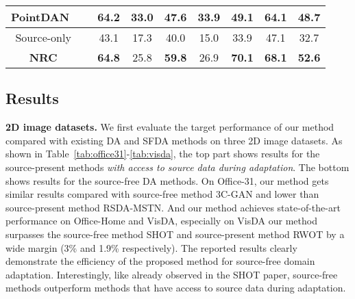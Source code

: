 \documentclass{article}
\newcommand{\cmark}{\ding{51}}\newcommand{\xmark}{\ding{55}}
\begin{document}
\begin{table}[btp]
\begin{minipage}[tbp]{0.99\textwidth}
\begin{center}
{{\begin{threeparttable}
\begin{tabular}{l|c|ccc cc cc}
\multicolumn{1}{c}{PointDAN~\cite{qin2019pointdan}}&\multicolumn{1}{|c|}{\xmark} &\multicolumn{1}{c}{{64.2}} &\multicolumn{1}{c}{\textbf{33.0}} &\multicolumn{1}{c}{{47.6}}  &\multicolumn{1}{c}{\textbf{33.9}} &\multicolumn{1}{c}{{49.1}} &\multicolumn{1}{c}{{64.1}}  &\multicolumn{1}{c}{{48.7}}\\

\toprule
\multicolumn{1}{c}{Source-only}&\multicolumn{1}{|c|}{} &\multicolumn{1}{c}{43.1} &\multicolumn{1}{c}{17.3} &\multicolumn{1}{c}{40.0}  &\multicolumn{1}{c}{15.0} &\multicolumn{1}{c}{33.9} &\multicolumn{1}{c}{47.1}  &\multicolumn{1}{c}{32.7}\\



\multicolumn{1}{c}{\textbf{NRC}}&\multicolumn{1}{|c|}{\cmark}&\multicolumn{1}{c}{\textbf{64.8}} &\multicolumn{1}{c}{{25.8}} &\multicolumn{1}{c}{\textbf{59.8}}  &\multicolumn{1}{c}{{26.9}} &\multicolumn{1}{c}{\textbf{70.1}} &\multicolumn{1}{c}{\textbf{68.1}}  &\multicolumn{1}{c}{\textbf{52.6}}\\

\hline
\end{tabular}
\renewcommand{\labelitemi}{}
\end{threeparttable}
}}
\end{center}
\vspace{-4mm}
\end{minipage}
\end{table}



\subsection{Results}
\noindent \textbf{2D image datasets.} We first evaluate the target performance of our method compared with existing DA and SFDA methods on three 2D image datasets. As shown in Table~\ref{tab:office31}-\ref{tab:visda}, the top part shows results for the source-present methods \textit{with access to source data during adaptation}. The bottom shows results for the source-free DA methods. 
On Office-31, our method gets similar results compared with source-free method 3C-GAN and lower than source-present method RSDA-MSTN. And our method achieves state-of-the-art performance on Office-Home and VisDA, especially on VisDA our method surpasses the source-free method SHOT and source-present method RWOT by a wide margin (3\% and 1.9\% respectively). The reported results clearly demonstrate the efficiency of the proposed method for source-free domain adaptation. Interestingly, like already observed in the SHOT paper, source-free methods outperform methods that have access to source data during adaptation. 
\end{document}
